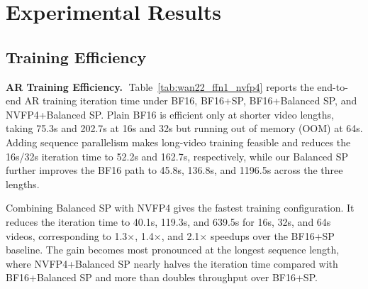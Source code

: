 \documentclass{llmxive}
\begin{document}
\section{Experimental Results}
\subsection{Training Efficiency}
\textbf{AR Training Efficiency.}$\;$
Table~\ref{tab:wan22_ffn1_nvfp4} reports the end-to-end AR training iteration time under BF16, BF16+SP, BF16+Balanced SP, and NVFP4+Balanced SP. Plain BF16 is efficient only at shorter video lengths, taking 75.3s and 202.7s at 16s and 32s but running out of memory (OOM) at 64s. Adding sequence parallelism makes long-video training feasible and reduces the 16s/32s iteration time to 52.2s and 162.7s, respectively, while our Balanced SP further improves the BF16 path to 45.8s, 136.8s, and 1196.5s across the three lengths.

Combining Balanced SP with NVFP4 gives the fastest training configuration. It reduces the iteration time to 40.1s, 119.3s, and 639.5s for 16s, 32s, and 64s videos, corresponding to 1.3$\times$, 1.4$\times$, and 2.1$\times$ speedups over the BF16+SP baseline. The gain becomes most pronounced at the longest sequence length, where NVFP4+Balanced SP nearly halves the iteration time compared with BF16+Balanced SP and more than doubles throughput over BF16+SP. 
\end{document}
